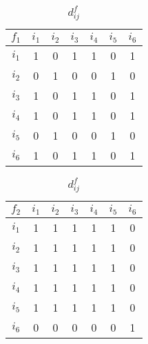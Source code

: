 \begin{table}[p]
\begin{center}
    \caption{$d_{ij}^{f}$}
    \label{tab:d_ijf}
    \begin{tabular}{ | c | c | c | c | c | c | c | } 
    \hline
     $f_1$ & $i_1$ & $i_2$ & $i_3$ & $i_4$ & $i_5$ & $i_6$  \\ \hline
     $i_1$ & 1  &  0  &  1  &  1  &  0  &  1 \\ \hline
     $i_2$ & 0  &  1  &  0  &  0  &  1  &  0  \\ \hline
     $i_3$ & 1  &  0  &  1  &  1  &  0  &  1 \\ \hline
     $i_4$ & 1  &  0  &  1  &  1  &  0  &  1 \\ \hline
     $i_5$ & 0  &  1  &  0  &  0  &  1  &  0 \\ \hline
     $i_6$ & 1  &  0  &  1  &  1  &  0  &  1 \\ \hline
    \end{tabular}
    \quad
    \begin{tabular}{ | c | c | c | c | c | c | c | } 
    \hline
     $f_2$ & $i_1$ & $i_2$ & $i_3$ & $i_4$ & $i_5$ & $i_6$  \\ \hline
     $i_1$ & 1  &  1  &  1   & 1  &  1  &  0 \\ \hline
     $i_2$ & 1  &  1  &  1   & 1  &  1  &  0  \\ \hline
     $i_3$ & 1  &  1  &  1   & 1  &  1  &  0 \\ \hline
     $i_4$ & 1  &  1  &  1   & 1  &  1  &  0 \\ \hline
     $i_5$ & 1  &  1  &  1   & 1  &  1  &  0 \\ \hline
     $i_6$ & 0  &  0  &  0   & 0  &  0  &  1 \\ \hline
    \end{tabular}
    

\end{center}
\end{table}
